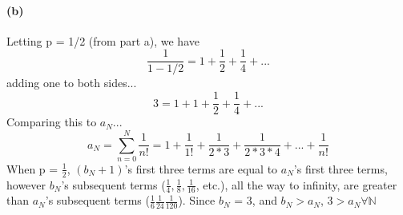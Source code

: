 \documentclass[10pt,letter]{article}
\begin{document}
\paragraph{(b)} Letting p = 1/2 (from part a), we have 
$$ \frac{1}{1-1/2} = 1 + \frac{1}{2} + \frac{1}{4} + ...$$ 
adding one to both sides... 
$$3 = 1 + 1 + \frac{1}{2} + \frac{1}{4} + ...$$
Comparing this to $a_N$...
$$a_N = \sum_{n=0}^{N} \frac{1}{n!} = 1 + \frac{1}{1!} + \frac{1}{2*3} + \frac{1}{2*3*4} + ... + \frac{1}{n!}$$ 
When p = $\frac{1}{2}$, $(b_N + 1)$'s first three terms are equal to $a_N$'s first three terms, however $b_N$'s subsequent terms ($\frac{1}{4}, \frac{1}{8}, \frac{1}{16}$, etc.), all the way to infinity, are greater than $a_N$'s subsequent terms ($\frac{1}{6} \frac{1}{24} \frac{1}{120}$). Since $b_N$ = 3, and $b_N > a_N$, $3 > a_N \forall \mathbb{N}$
\end{document}
